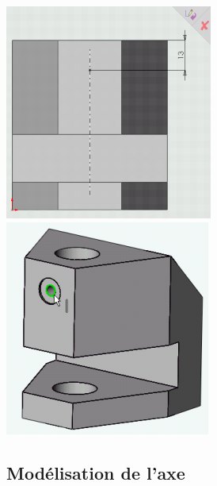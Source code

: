 \begin{minipage}{0.23\linewidth}
\includegraphics[width=0.9\linewidth]{img/022} \\ \vfill
\includegraphics[width=0.9\linewidth]{img/023}
\end{minipage}

\subsection{Modélisation de l'axe}

